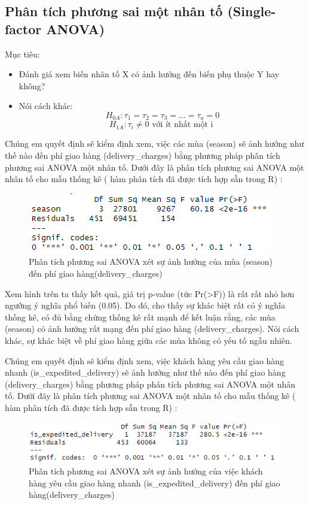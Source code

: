 \subsection{Phân tích phương sai một nhân tố (Single-factor ANOVA)}
Mục tiêu:
\begin{itemize}
    \item Đánh giá xem biến nhân tố X có ảnh hưởng đến biến phụ thuộc Y hay không?
    \item Nói cách khác:
    \[
        H_{0A}: \tau_{1} = \tau_{2} = \tau_{3} = \dots = \tau_{a} = 0
            \]
            \[
            H_{1A}: \tau_{i} \neq  0 \text{ với ít nhất một i }
            \]
\end{itemize}
    Chúng em quyết định sẽ kiểm định xem, việc các mùa (season) sẽ ảnh hưởng như thế nào đến phí giao hàng (delivery\_charges) bằng
phương pháp phân tích phương sai ANOVA một nhân tố. Dưới đây là phân tích phương sai ANOVA một nhân tố cho mẫu thống kê ( hàm phân tích đã được tích hợp sẵn trong R) :

\begin{figure}[!htbp]
    \centering
    \includegraphics[width=0.4\linewidth]{graphics/5.3.1.png}
    \caption{Phân tích phương sai ANOVA xét sự ảnh hưởng của mùa (season) đến phí giao hàng(delivery\_charges)}
\end{figure}

    Xem hình trên ta thấy kết quả, giá trị p-value (tức Pr(>F)) là rất rất nhỏ hơn ngưỡng ý nghĩa phổ biến (0.05). Do đó, cho thấy sự
khác biệt rất có ý nghĩa thống kê, có đủ bằng chứng thống kê rất mạnh để kết luận rằng, các mùa (season) có ảnh hưởng rất mạng đến phí giao hàng (delivery\_charges). Nói cách khác, sự khác biệt về phí giao hàng giữa các mùa không có yếu tố ngẫu nhiên.


    Chúng em quyết định sẽ kiểm định xem, việc khách hàng yêu cầu giao hàng nhanh (is\_expedited\_delivery) sẽ ảnh hưởng như thế nào đến
phí giao hàng (delivery\_charges) bằng phương pháp phân tích phương sai ANOVA một nhân tố. Dưới đây là phân tích phương sai ANOVA một nhân tố cho mẫu thống kê ( hàm phân tích đã được tích hợp sẵn trong R) :
\begin{figure}[!htbp]
    \centering
    \includegraphics[width=0.4\linewidth]{graphics/5.3.2.png}
    \caption{Phân tích phương sai ANOVA xét sự ảnh hưởng của việc khách hàng yêu cầu giao hàng nhanh (is\_expedited\_delivery) đến phí giao hàng(delivery\_charges)}
\end{figure}

